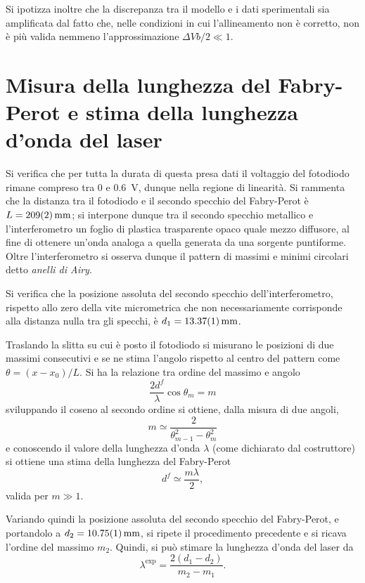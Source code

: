 \documentclass[10pt,oneside,a4paper]{article}
\begin{document}
\begin{multicols}{2}
Si ipotizza inoltre che la discrepanza tra il modello e i dati sperimentali sia amplificata dal fatto che, nelle condizioni in cui l'allineamento non è corretto, non è più valida nemmeno l'approssimazione ${\Delta V b/ 2 \ll 1}$.

\section{Misura della lunghezza del Fabry-Perot e stima della lunghezza d'onda del laser}
Si verifica che per tutta la durata di questa presa dati il voltaggio del fotodiodo rimane compreso tra \SI{0}{} e \SI{0.6}{V}, dunque nella regione di linearità. Si rammenta che la distanza tra il fotodiodo e il secondo specchio del Fabry-Perot è $L=\SI{209 \pm 2}{mm}$; si interpone dunque tra il secondo specchio metallico e l'interferometro un foglio di plastica trasparente opaco quale mezzo diffusore, al fine di ottenere un'onda analoga a quella generata da una sorgente puntiforme. Oltre l'interferometro si osserva dunque il pattern di massimi e minimi circolari detto \emph{anelli di Airy}.

Si verifica che la posizione assoluta del secondo specchio dell'interferometro, rispetto allo zero della vite micrometrica che non necessariamente corrisponde alla distanza nulla tra gli specchi, è $d_1 = \SI{13.37 \pm 0.01}{mm}$.

Traslando la slitta su cui è posto il fotodiodo si misurano le posizioni di due massimi consecutivi e se ne stima l'angolo rispetto al centro del pattern come $\theta = (x-x_0) / L$. Si ha la relazione tra ordine del massimo e angolo 
\begin{equation}\label{eq:diff}
\frac{2d^f}{\lambda} \cos{\theta_m} = m
\end{equation}
sviluppando il coseno al secondo ordine si ottiene, dalla misura di due angoli,
\[
m \simeq \frac{2}{\theta_{m-1}^2 - \theta_{m}^2}
\]
e conoscendo il valore della lunghezza d'onda $\lambda$ (come dichiarato dal costruttore) si ottiene una stima della lunghezza del Fabry-Perot
\[
d^f \simeq \frac{m \lambda}{2},
\]
valida per $m \gg 1$.

Variando quindi la posizione assoluta del secondo specchio del Fabry-Perot, e portandolo a $d_2 = \SI{10.75 \pm 0.01}{mm}$, si ripete il procedimento precedente e si ricava l'ordine del massimo $m_2$. Quindi, si può stimare la lunghezza d'onda del laser da \[
\lambda^{\text{exp}} = \frac{2(d_1 - d_2)}{m_2 - m_1}.
\]


\end{multicols}
\end{document}
